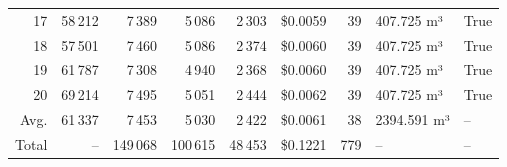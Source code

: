 \documentclass[a4paper,11pt]{article}
\begin{document}
\begin{table}[ht]
\begin{tabular}{r r r r r r r p{3cm} l}
17 & 58\,212 & 7\,389 & 5\,086 & 2\,303 & \$0.0059 & 39 & 407.725 m³ & True \\
18 & 57\,501 & 7\,460 & 5\,086 & 2\,374 & \$0.0060 & 39 & 407.725 m³ & True \\
19 & 61\,787 & 7\,308 & 4\,940 & 2\,368 & \$0.0060 & 39 & 407.725 m³ & True \\
20 & 69\,214 & 7\,495 & 5\,051 & 2\,444 & \$0.0062 & 39 & 407.725 m³ & True \\
\hline
Avg. & 61\,337 & 7\,453 & 5\,030 & 2\,422 & \$0.0061 & 38 & 2394.591 m³ & -- \\
Total & -- & 149\,068 & 100\,615 & 48\,453 & \$0.1221 & 779 & -- & -- \\
\hline
\end{tabular}
\end{table}

\clearpage
\end{document}
